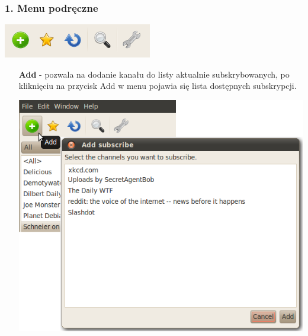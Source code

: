 \documentclass[a4paper,11pt]{report}
\begin{document}
\newpage
\subsubsection*{1. Menu podręczne}

\includegraphics[scale=0.8]{./img/menu.png}

\begin{itemize}
	\item[\textbf{Add}] - pozwala na dodanie kanału do listy aktualnie 
		subskrybowanych, po kliknięciu na przycisk Add w menu pojawia
		się lista dostępnych subskrypcji.
	\begin{center}
		\includegraphics[scale=0.5]{./img/menu_add.png}
	\end{center}


\end{itemize}
\end{document}
